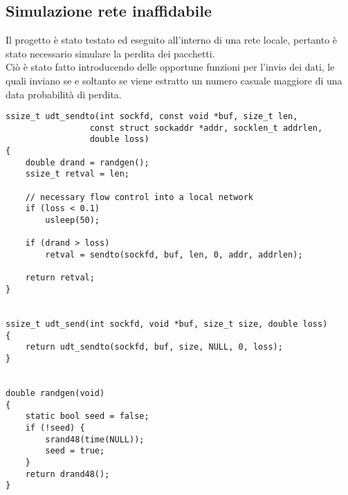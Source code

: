 \subsection{Simulazione rete inaffidabile}
Il progetto è stato testato ed eseguito all'interno di una rete locale, pertanto è stato necessario simulare la perdita dei pacchetti.\\
Ciò è stato fatto introducendo delle opportune funzioni per l'invio dei dati, le quali inviano se e soltanto se viene estratto un numero casuale maggiore di una data probabilità di perdita.

\begin{lstlisting}[title=simul\_udt.c]
ssize_t udt_sendto(int sockfd, const void *buf, size_t len, 
				 const struct sockaddr *addr, socklen_t addrlen,
				 double loss)
{
	double drand = randgen();
	ssize_t retval = len;

	// necessary flow control into a local network
	if (loss < 0.1)
		usleep(50);

	if (drand > loss) 
		retval = sendto(sockfd, buf, len, 0, addr, addrlen);

	return retval;
}


ssize_t udt_send(int sockfd, void *buf, size_t size, double loss)
{
	return udt_sendto(sockfd, buf, size, NULL, 0, loss);
}


double randgen(void)
{
	static bool seed = false;
	if (!seed) {
		srand48(time(NULL));
		seed = true;
	}
	return drand48();
}
\end{lstlisting}
